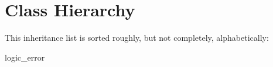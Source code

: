 \section{Class Hierarchy}
This inheritance list is sorted roughly, but not completely, alphabetically\-:\begin{DoxyCompactList}
\item {}
\begin{DoxyCompactList}
\item {}
\end{DoxyCompactList}
\item logic\-\_\-error\begin{DoxyCompactList}
\item {}
\end{DoxyCompactList}
\item {}
\end{DoxyCompactList}
